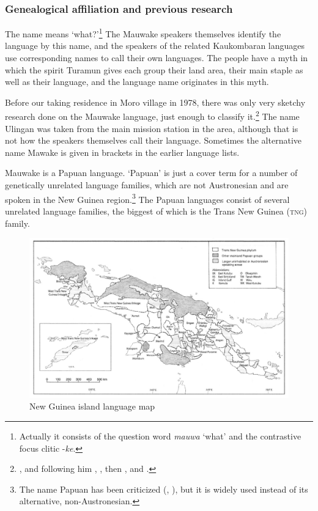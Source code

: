 \subsubsection{Genealogical affiliation and previous research}\label{sec:1.4.1:geneological}
The name  means `what?'\footnote{Actually it consists of the question word \textit{mauwa} `what' and the contrastive focus clitic -\textit{ke}.}  The Mauwake speakers themselves identify the language by this name, and the speakers of the related Kaukombaran languages use corresponding names to call their own languages.  The people have a myth in which the spirit Turamun gives each group their land area, their main staple as well as their language, and the language name originates in this myth.

Before our taking residence in Moro village in 1978, there was only very sketchy research done on the Mauwake language, just enough to classify it.\footnote{\citet{Capell1952}, and following him \citet{VoegelinEtAl1965}, \citet{Greenberg1971}, then \citet{ZGraggen1971,ZGraggen1975a}, \citet{Wurm1975,Wurm1982} and \citet{Hattori1981}.} The name Ulingan was taken from the main mission station in the area, although that is not how the speakers themselves call their language. Sometimes the alternative name Mawake is given in brackets in the earlier language lists.  

Mauwake is a Papuan language. `Papuan' is just a cover term for a number of genetically unrelated language families, which are not Austronesian and are spoken in the New Guinea region.\footnote{The name Papuan has been criticized (\citealt{Capell1969}, \citealt{Haiman1979}), but it is widely used instead of its alternative, non-Austronesian.} The Papuan languages consist of several unrelated language families, the biggest of which is the Trans New Guinea (\textsc{tng}) family.  


\begin{figure}
\caption{New Guinea island language map \citep[34 Map~2]{Ross2005}}
\label{map:2:NewGuineamap}
\includegraphics[width=\textwidth]{figures/1-new_guinea_island_language_map.jpeg}
\end{figure}

